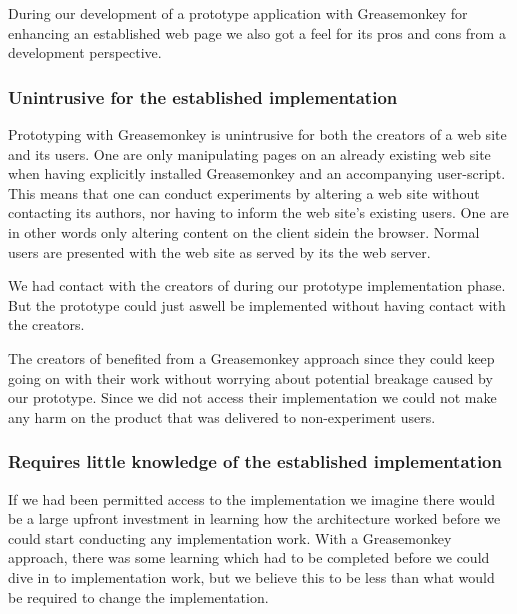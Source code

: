 \parabreak

During our development of a prototype application with Greasemonkey for
enhancing an established web page we also got a feel for its pros and cons
from a development perspective.

\subsubsection{Unintrusive for the established implementation}

Prototyping with Greasemonkey is unintrusive for both the creators
of a web site and its users.  One are only manipulating
pages on an already existing web site when having explicitly installed
Greasemonkey and an accompanying user-script. This means that one can
conduct experiments by altering a web site without contacting its authors,
nor having to inform the web site's existing users. One are in other words
only altering content on the client side\dash{}in the browser. Normal users
are presented with the web site as served by its the web server.

We had contact with the creators of \urort{} during our prototype
implementation phase. But the prototype could just aswell be implemented
without having contact with the creators.%

The creators of \urort{} benefited from a Greasemonkey approach since they
could keep going on with their work without worrying about potential breakage
caused by our prototype. Since we did not access their implementation we could
not make any harm on the product that was delivered to non-experiment users.

\subsubsection{Requires little knowledge of the established implementation}

If we had been permitted access to the \urort{} implementation we imagine
there would be a large upfront investment in learning how the \urort{}
architecture worked before we could start conducting any implementation work.
With a Greasemonkey approach, there was some learning which had to be
completed before we could dive in to implementation work, but we believe this
to be less than what would be required to change the \urort{} implementation.

